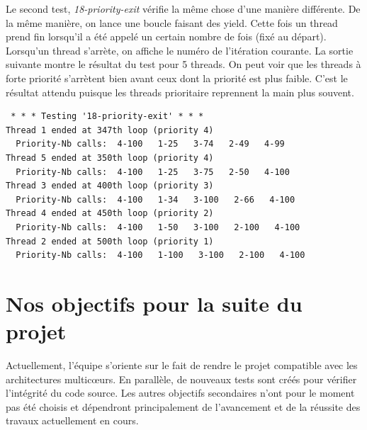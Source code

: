 \documentclass[a4paper,11pt]{article}
\begin{document}
Le second test, \textit{18-priority-exit} vérifie la même chose d'une manière différente. De la même manière, on lance une boucle faisant des yield. Cette fois un thread prend fin lorsqu'il a été appelé un certain nombre de fois (fixé au départ). Lorsqu'un thread s'arrète, on affiche le numéro de l'itération courante. La sortie suivante montre le résultat du test pour 5 threads. On peut voir que les threads à forte priorité s'arrètent bien avant ceux dont la priorité est plus faible. C'est le résultat attendu puisque les threads prioritaire reprennent la main plus souvent.
\begin{verbatim}
 * * * Testing '18-priority-exit' * * *
Thread 1 ended at 347th loop (priority 4)
  Priority-Nb calls:  4-100   1-25   3-74   2-49   4-99  
Thread 5 ended at 350th loop (priority 4)
  Priority-Nb calls:  4-100   1-25   3-75   2-50   4-100  
Thread 3 ended at 400th loop (priority 3)
  Priority-Nb calls:  4-100   1-34   3-100   2-66   4-100  
Thread 4 ended at 450th loop (priority 2)
  Priority-Nb calls:  4-100   1-50   3-100   2-100   4-100  
Thread 2 ended at 500th loop (priority 1)
  Priority-Nb calls:  4-100   1-100   3-100   2-100   4-100
\end{verbatim}



\section{Nos objectifs pour la suite du projet}

Actuellement, l'équipe s'oriente sur le fait de rendre le projet compatible avec les architectures multic\oe urs. En parallèle, de nouveaux tests sont créés pour vérifier l'intégrité du code source. Les autres objectifs secondaires n'ont pour le moment pas été choisis et dépendront principalement de l'avancement et de la réussite des travaux actuellement en cours.
\end{document}
